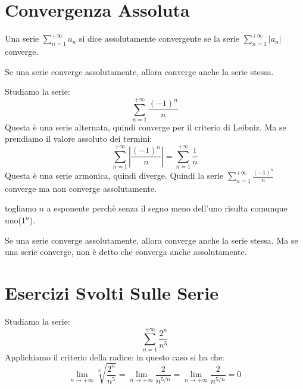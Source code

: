 \section{Convergenza Assoluta}
    \begin{definizione}
        Una serie $\sum_{n=1}^{+\infty} a_n$ si dice assolutamente convergente se la serie $\sum_{n=1}^{+\infty} |a_n|$ converge.
    \end{definizione}
    \begin{approfondimento}
        Se una serie converge assolutamente, allora converge anche la serie stessa.
    \end{approfondimento}
    \begin{esempio}
        Studiamo la serie:
            \[ \sum_{n=1}^{+\infty} \frac{(-1)^n}{n} \]
        Questa è una serie alternata, quindi converge per il criterio di Leibniz. Ma se prendiamo il valore assoluto dei termini:
            \[ \sum_{n=1}^{+\infty} \left| \frac{(-1)^n}{n} \right| = \sum_{n=1}^{+\infty} \frac{1}{n} \]
        Questa è una serie armonica, quindi diverge. Quindi la serie $\sum_{n=1}^{+\infty} \frac{(-1)^n}{n}$ converge ma non converge assolutamente.
            \begin{approfondimento}
                togliamo $n$ a esponente perchè senza il segno meno dell'uno risulta comunque uno($1^n$).
            \end{approfondimento}
    \end{esempio}
    \begin{approfondimento}
        Se una serie converge assolutamente, allora converge anche la serie stessa. Ma se una serie converge, non è detto che converga anche assolutamente.
    \end{approfondimento}
\section{Esercizi Svolti Sulle Serie}
    \begin{esempio}
        Studiamo la serie:
        \[ \sum_{n=1}^{+\infty} \frac{2^n}{n^5} \]
        Applichiamo il criterio della radice:
        in questo caso si ha che:
        \begin{equation} \lim_{n \to +\infty} \sqrt[n]{\frac{2^n}{n^5}} = \lim_{n \to +\infty} \frac{2}{n^{5/n}} = \lim_{n \to +\infty} \frac{2}{n^{5/n}} = 0
        \end{equation}
    \end{esempio}